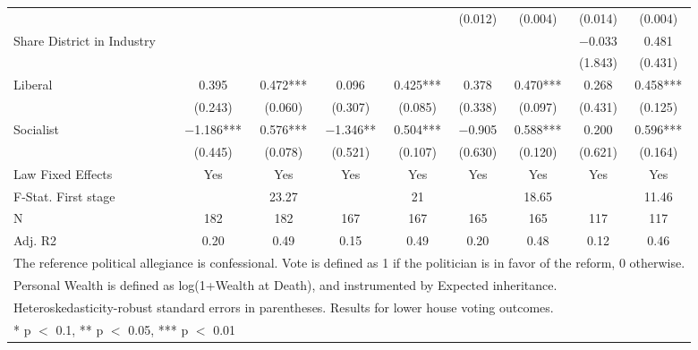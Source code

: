 \begin{table}
\begin{tabular}[t]{lcccccccc}
 &  &  &  &  & (\num{0.012}) & (\num{0.004}) & (\num{0.014}) & (\num{0.004})\\
Share District in Industry &  &  &  &  &  &  & \num{-0.033} & \num{0.481}\\
 &  &  &  &  &  &  & (\num{1.843}) & (\num{0.431})\\
Liberal & \num{0.395} & \num{0.472}*** & \num{0.096} & \num{0.425}*** & \num{0.378} & \num{0.470}*** & \num{0.268} & \num{0.458}***\\
 & (\num{0.243}) & (\num{0.060}) & (\num{0.307}) & (\num{0.085}) & (\num{0.338}) & (\num{0.097}) & (\num{0.431}) & (\num{0.125})\\
Socialist & \num{-1.186}*** & \num{0.576}*** & \num{-1.346}** & \num{0.504}*** & \num{-0.905} & \num{0.588}*** & \num{0.200} & \num{0.596}***\\
 & (\num{0.445}) & (\num{0.078}) & (\num{0.521}) & (\num{0.107}) & (\num{0.630}) & (\num{0.120}) & (\num{0.621}) & (\num{0.164})\\
\midrule
Law Fixed Effects & Yes & Yes & Yes & Yes & Yes & Yes & Yes & Yes\\
F-Stat. First stage &  & 23.27 &  & 21 &  & 18.65 &  & 11.46\\
N & \num{182} & \num{182} & \num{167} & \num{167} & \num{165} & \num{165} & \num{117} & \num{117}\\
Adj. R2 & \num{0.20} & \num{0.49} & \num{0.15} & \num{0.49} & \num{0.20} & \num{0.48} & \num{0.12} & \num{0.46}\\
\bottomrule
\multicolumn{9}{l}{\rule{0pt}{1em}The reference political allegiance is confessional. Vote is defined as 1 if the politician is in favor of the reform, 0 otherwise.}\\
\multicolumn{9}{l}{\rule{0pt}{1em}Personal Wealth is defined as log(1+Wealth at Death), and instrumented by Expected inheritance.}\\
\multicolumn{9}{l}{\rule{0pt}{1em}Heteroskedasticity-robust standard errors in parentheses. Results for lower house voting outcomes.}\\
\multicolumn{9}{l}{\rule{0pt}{1em}* p $<$ 0.1, ** p $<$ 0.05, *** p $<$ 0.01}\\
\end{tabular}
\end{table}
